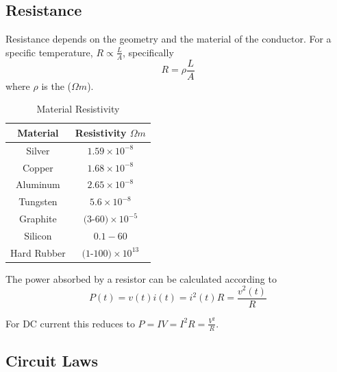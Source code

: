 \subsection{Resistance}

Resistance depends on the geometry and the material of the conductor. For a specific temperature, $R \propto \frac{L}{A}$, specifically \begin{equation*}
    R = \rho\frac{L}{A}
\end{equation*}
where $\rho$ is the  ($\Omega m$).

\begin{table}[H]
    \centering
    \caption{Material Resistivity}
    \begin{tabular}{|cc|}
        \hline 
        Material & Resistivity $\Omega m$ \\ \hline
        Silver & $1.59\times 10^{-8}$ \\ \hline
        Copper & $ 1.68\times 10^{-8}$ \\ \hline 
        Aluminum & $2.65\times 10^{-8}$ \\ \hline
        Tungsten & $5.6\times 10^{-8}$ \\ \hline
        Graphite & $(3$-$60)\times 10^{-5}$ \\\hline
        Silicon & $0.1-60$ \\ \hline
        Hard Rubber & $(1$-$100)\times 10^{13}$ \\ \hline
    \end{tabular}
\end{table}

\begin{defn}
    The power absorbed by a resistor can be calculated according to \begin{equation*}
        P(t) = v(t)i(t) = i^2(t)R = \frac{v^2(t)}{R}
    \end{equation*}
\end{defn}
For DC current this reduces to $P = IV = I^2R = \frac{V^2}{R}$.

\subsection{Circuit Laws}


